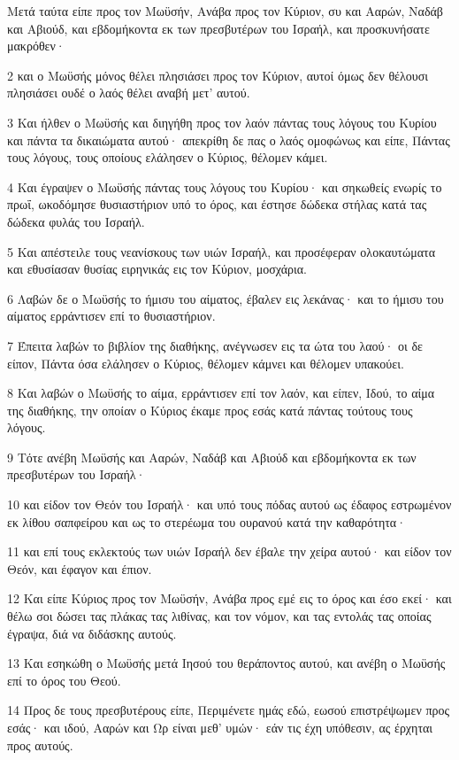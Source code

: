 \par Μετά ταύτα είπε προς τον Μωϋσήν, Ανάβα προς τον Κύριον, συ και Ααρών, Ναδάβ και Αβιούδ, και εβδομήκοντα εκ των πρεσβυτέρων του Ισραήλ, και προσκυνήσατε μακρόθεν·
\par 2 και ο Μωϋσής μόνος θέλει πλησιάσει προς τον Κύριον, αυτοί όμως δεν θέλουσι πλησιάσει ουδέ ο λαός θέλει αναβή μετ' αυτού.
\par 3 Και ήλθεν ο Μωϋσής και διηγήθη προς τον λαόν πάντας τους λόγους του Κυρίου και πάντα τα δικαιώματα αυτού· απεκρίθη δε πας ο λαός ομοφώνως και είπε, Πάντας τους λόγους, τους οποίους ελάλησεν ο Κύριος, θέλομεν κάμει.
\par 4 Και έγραψεν ο Μωϋσής πάντας τους λόγους του Κυρίου· και σηκωθείς ενωρίς το πρωΐ, ωκοδόμησε θυσιαστήριον υπό το όρος, και έστησε δώδεκα στήλας κατά τας δώδεκα φυλάς του Ισραήλ.
\par 5 Και απέστειλε τους νεανίσκους των υιών Ισραήλ, και προσέφεραν ολοκαυτώματα και εθυσίασαν θυσίας ειρηνικάς εις τον Κύριον, μοσχάρια.
\par 6 Λαβών δε ο Μωϋσής το ήμισυ του αίματος, έβαλεν εις λεκάνας· και το ήμισυ του αίματος ερράντισεν επί το θυσιαστήριον.
\par 7 Έπειτα λαβών το βιβλίον της διαθήκης, ανέγνωσεν εις τα ώτα του λαού· οι δε είπον, Πάντα όσα ελάλησεν ο Κύριος, θέλομεν κάμνει και θέλομεν υπακούει.
\par 8 Και λαβών ο Μωϋσής το αίμα, ερράντισεν επί τον λαόν, και είπεν, Ιδού, το αίμα της διαθήκης, την οποίαν ο Κύριος έκαμε προς εσάς κατά πάντας τούτους τους λόγους.
\par 9 Τότε ανέβη Μωϋσής και Ααρών, Ναδάβ και Αβιούδ και εβδομήκοντα εκ των πρεσβυτέρων του Ισραήλ·
\par 10 και είδον τον Θεόν του Ισραήλ· και υπό τους πόδας αυτού ως έδαφος εστρωμένον εκ λίθου σαπφείρου και ως το στερέωμα του ουρανού κατά την καθαρότητα·
\par 11 και επί τους εκλεκτούς των υιών Ισραήλ δεν έβαλε την χείρα αυτού· και είδον τον Θεόν, και έφαγον και έπιον.
\par 12 Και είπε Κύριος προς τον Μωϋσήν, Ανάβα προς εμέ εις το όρος και έσο εκεί· και θέλω σοι δώσει τας πλάκας τας λιθίνας, και τον νόμον, και τας εντολάς τας οποίας έγραψα, διά να διδάσκης αυτούς.
\par 13 Και εσηκώθη ο Μωϋσής μετά Ιησού του θεράποντος αυτού, και ανέβη ο Μωϋσής επί το όρος του Θεού.
\par 14 Προς δε τους πρεσβυτέρους είπε, Περιμένετε ημάς εδώ, εωσού επιστρέψωμεν προς εσάς· και ιδού, Ααρών και Ωρ είναι μεθ' υμών· εάν τις έχη υπόθεσιν, ας έρχηται προς αυτούς.
